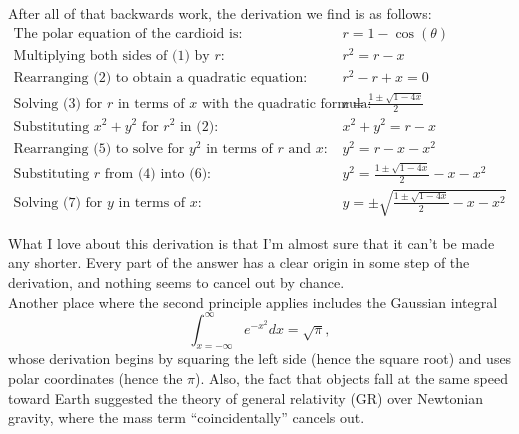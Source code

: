 \documentclass{article}
\begin{document}
After all of that backwards work, the derivation we find is as follows:
\begin{align}
\text{The polar equation of the cardioid is: } & r = 1-\cos(\theta) \\
\text{Multiplying both sides of (1) by } r \text{: } & r^2 = r-x \\
\text{Rearranging (2) to obtain a quadratic equation: } & r^2-r+x = 0 \\
\text{Solving (3) for } r \text{ in terms of } x \text{ with the quadratic formula: } & r = \frac{1\pm\sqrt{1-4x}}{2} \\
\text{Substituting } x^2+y^2 \text{ for } r^2 \text{ in (2): } & x^2+y^2 = r-x \\
\text{Rearranging (5) to solve for } y^2 \text{ in terms of } r \text{ and } x \text{: } & y^2 = r-x-x^2 \\
\text{Substituting } r \text{ from (4) into (6): } & y^2 = \frac{1\pm\sqrt{1-4x}}{2}-x-x^2\\
\text{Solving (7) for } y \text{ in terms of } x \text{: } & y = \pm\sqrt{\frac{1\pm\sqrt{1-4x}}{2}-x-x^2}
\end{align}

What I love about this derivation is that I'm almost sure that it can't be made any shorter.
Every part of the answer has a clear origin in some step of the derivation, and nothing seems to cancel out by chance.\\

Another place where the second principle applies includes the Gaussian integral
\[\int_{x=-\infty}^{\infty}e^{-x^2}dx=\sqrt{\pi},\]
whose derivation begins by squaring the left side (hence the square root)
and uses polar coordinates (hence the $\pi$).
Also, the fact that objects fall at the same speed toward Earth
suggested the theory of general relativity (GR)
over Newtonian gravity, where the mass term ``coincidentally'' cancels out.
\end{document}
